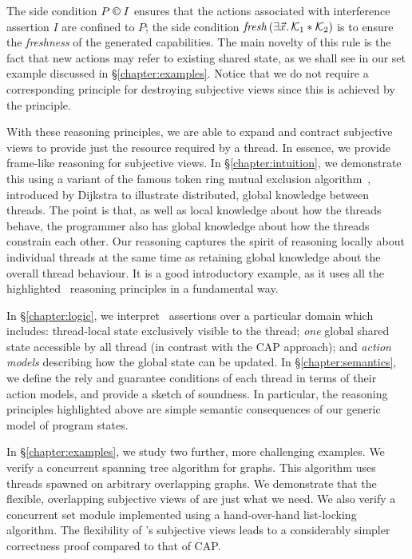 The side condition $P \containI I$ ensures that the actions associated with interference assertion $I$ are confined to $P$; the side condition $\mathit{fresh}\left(\exists \vec{x}.\, \mathcal{K}_{1} * \mathcal{K}_{2}\right)$ is to ensure the \emph{freshness} of the generated capabilities. 
The main novelty of this rule is the fact that new actions may refer to existing shared state, as we shall see  in our set example discussed in \S\ref{chapter:examples}. Notice that we do not require a corresponding principle for destroying subjective views since this is achieved by the \forgetRule principle. 

With these reasoning principles, we are able to expand and contract subjective views  to provide just the resource required by a thread.
In essence, we provide  frame-like reasoning for  subjective  views. 
In \S\ref{chapter:intuition}, we demonstrate this using a variant of the famous  token ring mutual exclusion algorithm~\cite{dijkstra74}, introduced by Dijkstra to illustrate distributed, global knowledge between threads. The point is that, as well as local knowledge about how the threads behave, the programmer also has global knowledge about how the threads constrain each other. Our reasoning captures the spirit of reasoning locally about individual threads at the same time as retaining global knowledge about the overall thread behaviour. It is a good  introductory example, as it uses all the highlighted \colosl\ reasoning principles in a fundamental way. 

In \S\ref{chapter:logic}, we interpret \colosl\ assertions over a particular domain which includes: thread-local state exclusively visible to the thread; {\em one} global shared state accessible by all thread (in contrast with the CAP approach); and {\em action models} describing how the global state can be updated. In \S\ref{chapter:semantics}, we define the rely and guarantee conditions of each thread in terms of their action models, and provide a sketch of soundness. In particular, the reasoning principles highlighted above are simple semantic
consequences of our generic model of program states.  


In \S\ref{chapter:examples}, we study two further, more challenging examples. We verify a concurrent spanning tree algorithm for graphs. This algorithm uses threads spawned on arbitrary overlapping graphs. We demonstrate that the flexible, overlapping subjective views of \colosl are just what we need.  We also verify a concurrent set
module implemented using a hand-over-hand list-locking algorithm.
The flexibility of \colosl's subjective views leads to a considerably simpler correctness proof compared to that of CAP. 


